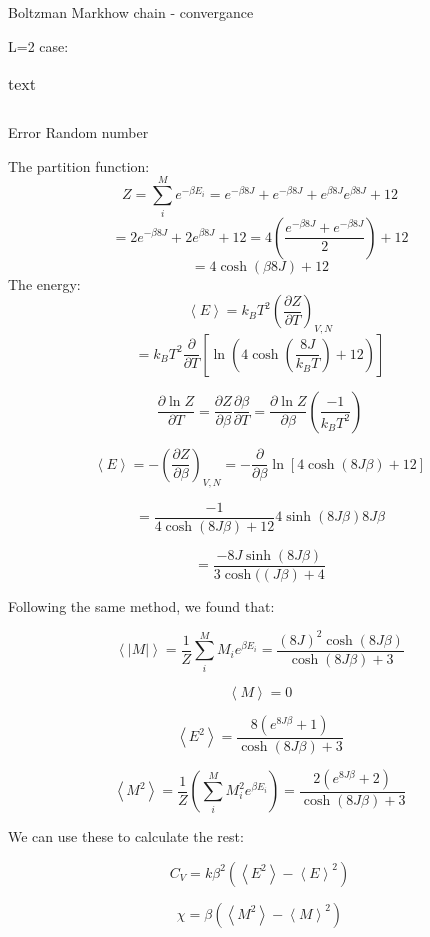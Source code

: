 

Boltzman
Markhow chain - convergance

L=2 case:
\begin{table}[H]
	\caption{text}
	\label{tab: makro}
\begin{tabular}{cccccc}
	
\end{tabular}
\end{table}

Error
Random number

The partition function:
\[
Z = \sum_i^M e^{-\beta E_i} = e^{-\beta 8 J} + e^{-\beta 8 J} + e^{\beta 8 J}e^{\beta 8 J} + 12
\]
\[
= 2e^{-\beta 8 J}+ 2e^{\beta 8 J} + 12 = 4\left(\frac{e^{-\beta 8 J}+ e^{-\beta 8 J}}{2}\right)+12
\]
\[
= 4 \cosh\left( \beta 8 J \right) + 12
\]
 The energy:
\[
\left< E \right> = k_B T^2 \left(\frac{\partial Z}{\partial T}
\right)_{V,N}
\]
\[
= k_B T^2 \frac{\partial}{\partial T} \left[\ln \left(4\cosh \left(\frac{8J}{k_BT}\right) +12\right) \right]\]

\[
\frac{\partial \ln Z}{\partial T} = \frac{\partial Z}{\partial \beta}\frac{\partial \beta}{\partial T} = \frac{\partial \ln Z}{\partial \beta}\left(\frac{-1}{k_B T^2}\right)
\]

\[
\left< E\right> = -\left(\frac{\partial Z}{\partial \beta} \right)_{V,N} = - \frac{\partial}{\partial \beta} \ln \left[ 4 \cosh \left( 8J\beta\right)+12\right]
\]

\[
= \frac{-1}{4\cosh (8J\beta) + 12}4 \sinh(8J\beta)8J\beta
\]

\[
= \frac{-8J \sinh(8J\beta)}{3\cosh((J\beta)+ 4}
\]

Following the same method, we found that:

\[
\left< |M| \right> = \frac{1}{Z} \sum_i^M M_i e^{\beta E_i}  = \frac{(8J)^2 \cosh(8J\beta )}{\cosh (8J\beta ) + 3}
\]

\[
\left< M \right> = 0
\]

\[
\left< E^2 \right> = \frac{8 \left( e^{8J\beta } + 1\right) }{\cosh (8J\beta ) + 3}
\]


\[
\left< M^2 \right> = \frac{1}{Z} \left( \sum_i^M M_i^2 e^{\beta E_i}\right) = \frac{2 \left( e^{8J\beta } + 2\right) }{\cosh (8J\beta ) + 3}
\]

We can use these to calculate the rest:

\[
C_V = k \beta^2\left( \left< E^2\right> - \left< E\right>^2 \right)
\]

\[
\chi = \beta \left( \left< M^2\right> - \left< M\right>^2\right)
\]